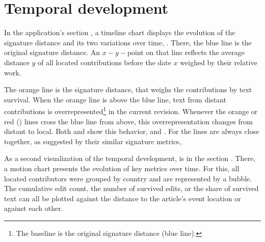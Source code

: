 


\section{Temporal development}


In the application's section , a timeline chart displays the evolution of the signature distance and its two variations over time, .
There, the blue line is the original signature distance.
An $x-y-$point on that line reflects the average distance $y$ of all located contributions before the date $x$ weighed by their relative work.



The orange line is the  signature distance, that weighs the contributions by text survival.
When the orange line is above the blue line, text from distant contributions is overrepresented\footnote{The baseline is the original signature distance (blue line).} in the current revision.
Whenever the orange or red () lines cross the blue line from above, this overrepresentation changes from distant to local.
Both  and  show this behavior,   and  .
For  the lines are always close together, as suggested by their similar signature metrics,  

As a second visualization of the temporal development, is in the section .
There, a motion chart presents the evolution of key metrics over time.
For this, all located contributors were grouped by country and are represented by a bubble. 
The cumulative edit count, the number of survived edits, or the share of survived text can all be plotted against the distance to the article's event location or against each other.

